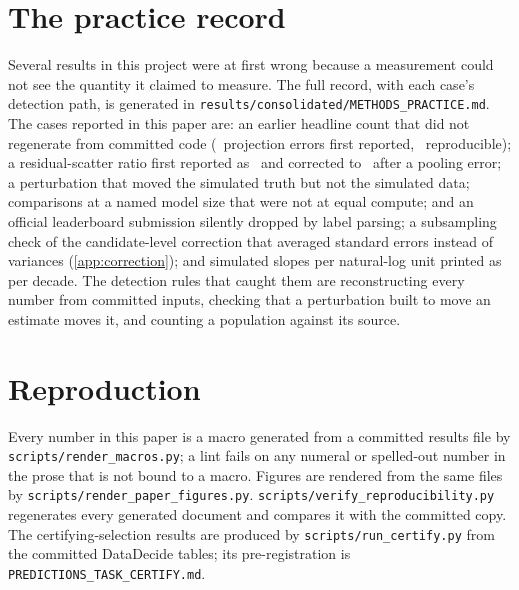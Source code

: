 \FloatBarrier
\section{The practice record}
\label{app:practice}

Several results in this project were at first wrong because a measurement could
not see the quantity it claimed to measure. The full record, with each case's
detection path, is generated in \texttt{results/consolidated/METHODS\_PRACTICE.md}.
The cases reported in this paper are: an earlier headline count that did not
regenerate from committed code (\shippedProjFlips\ projection errors first
reported, \recomputedProjFlips\ reproducible); a residual-scatter ratio first reported as
\residRatioSuperseded\ and corrected to \residRatio\ after a pooling error; a
perturbation that moved the simulated truth but not the simulated data;
comparisons at a named model size that were not at equal compute; and an
official leaderboard submission silently dropped by label parsing; a
subsampling check of the candidate-level correction that averaged standard
errors instead of variances (\cref{app:correction}); and simulated slopes per
natural-log unit printed as per decade. The detection
rules that caught them are reconstructing every number from committed inputs,
checking that a perturbation built to move an estimate moves it, and counting a
population against its source.

\FloatBarrier
\section{Reproduction}
\label{app:repro}

Every number in this paper is a macro generated from a committed results file
by \texttt{scripts/render\_macros.py}; a lint fails on any numeral or
spelled-out number in the prose that is not bound to a macro. Figures are
rendered from the same files by \texttt{scripts/render\_paper\_figures.py}.
\texttt{scripts/verify\_reproducibility.py} regenerates every generated document
and compares it with the committed copy. The certifying-selection results are
produced by \texttt{scripts/run\_certify.py} from the committed DataDecide
tables; its pre-registration is \texttt{PREDICTIONS\_TASK\_CERTIFY.md}.
